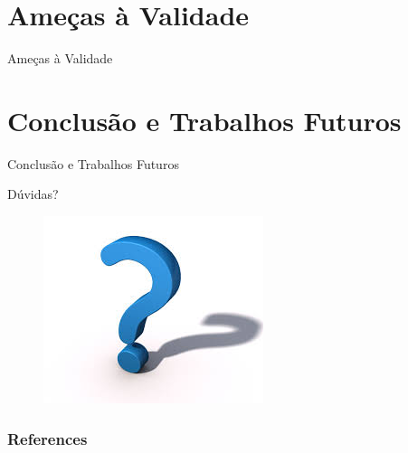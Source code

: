 \documentclass[t,14pt,mathserif]{beamer}
\begin{document}
\section{Ameças à Validade}

\begin{frame}{Ameças à Validade}

\end{frame}

\section{Conclusão e Trabalhos Futuros}

\begin{frame}{Conclusão e Trabalhos Futuros}

\end{frame}

\begin{frame}{Dúvidas?}
	\begin{figure}[hbtp]
		\centering
	    \includegraphics[scale=1]{../img/questions.jpg}
	\end{figure}
\end{frame}

\begin{frame}[allowframebreaks]
   \frametitle{References}
   
   
\end{frame}
\end{document}
